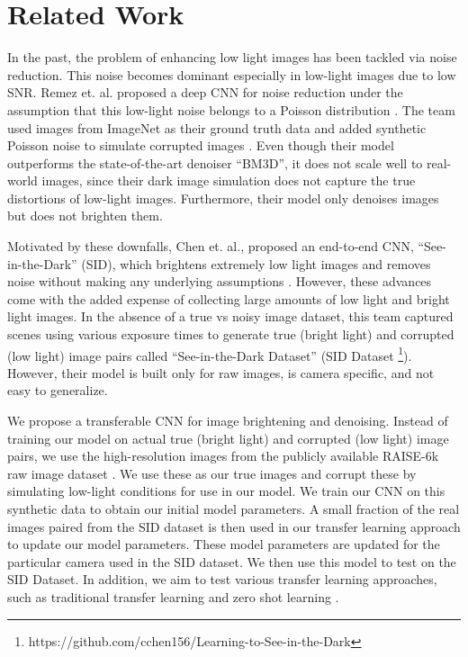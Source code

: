 \documentclass{article}
\begin{document}
\section{Related Work}

In the past, the problem of enhancing low light images has been tackled via noise reduction. This noise becomes dominant especially in low-light images due to low SNR. Remez et. al. proposed a deep CNN for noise reduction under
the assumption that this low-light noise belongs to a Poisson
distribution \cite{remez2017deep}.  The team used images from ImageNet as their ground truth data
and added synthetic Poisson noise to simulate corrupted images \cite{imagenet_cvpr09}. Even though
their model outperforms the state-of-the-art denoiser ``BM3D'', it does not
scale well to real-world images, since their dark image simulation does not capture the true distortions of low-light images.
Furthermore, their model only denoises images but does not brighten them.


Motivated by these downfalls, Chen et. al., proposed an end-to-end CNN,
``See-in-the-Dark'' (SID), which brightens extremely low light images and
removes noise without making any underlying assumptions
\cite{chen2018learning}. However, these advances come with the added expense
of collecting large amounts of low
light and bright light images. In the absence of a true vs noisy image
dataset, this team captured scenes using various exposure times to generate
true (bright light) and corrupted (low light) image pairs called
``See-in-the-Dark Dataset'' (SID Dataset
\footnote{https://github.com/cchen156/Learning-to-See-in-the-Dark}). However,
their model is built only for raw images, is camera specific, and not easy to generalize.\newline

We propose a transferable CNN for image brightening and denoising. Instead of training our model on actual true (bright light) and corrupted (low light) image pairs, we use the high-resolution images from the publicly available RAISE-6k raw image dataset \cite{Dang-Nguyen:2015:RRI:2713168.2713194}. We use these as our true images and corrupt these by simulating low-light conditions for use in our model. We train our CNN on this synthetic data to obtain our initial model parameters. A small fraction of the real images paired from the SID dataset is then used in our transfer learning \cite{Goodfellow-et-al-2016} approach to update our model parameters. These model parameters are updated for the particular camera used in the SID dataset. We then use this model to test on the SID Dataset. In addition, we aim to test various transfer learning approaches, such as traditional transfer learning and zero shot learning \cite{larochelle2008, NIPS2009_3650,socher2013zeroshot}. 
\end{document}
